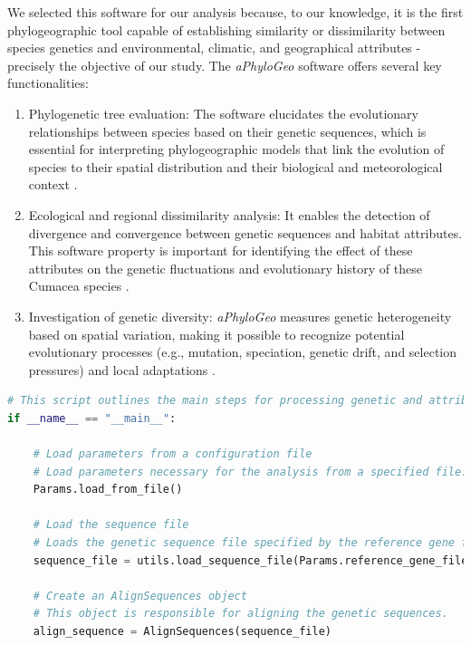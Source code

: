 {We selected this software for our analysis because, to our knowledge, it is the first phylogeographic tool capable of establishing similarity or dissimilarity between species genetics and environmental, climatic, and geographical attributes \citep{koshkarov_phylogeography_2022} - precisely the objective of our study. The \textit{aPhyloGeo} software offers several key functionalities:

\begin{enumerate}[label=\arabic*.]
\item Phylogenetic tree evaluation: The software elucidates the evolutionary relationships between species based on their genetic sequences, which is essential for interpreting phylogeographic models that link the evolution of species to their spatial distribution and their biological and meteorological context \citep{koshkarov_phylogeography_2022}.
\item Ecological and regional dissimilarity analysis: It enables the detection of divergence and convergence between genetic sequences and habitat attributes. This software property is important for identifying the effect of these attributes on the genetic fluctuations and evolutionary history of these Cumacea species \citep{koshkarov_phylogeography_2022}.
\item Investigation of genetic diversity: \textit{aPhyloGeo} measures genetic heterogeneity based on spatial variation, making it possible to recognize potential evolutionary processes (e.g., mutation, speciation, genetic drift, and selection pressures) and local adaptations \citep{manel_perspectives_2010}.
\end{enumerate}

\begin{lstlisting}[label=lst:main,language=Python,caption=Main script for tutorial using the aPhyloGeo package.]
# This script outlines the main steps for processing genetic and attribute data using the aPhyloGeo package.
if __name__ == "__main__":

    # Load parameters from a configuration file
    # Load parameters necessary for the analysis from a specified file.
    Params.load_from_file()

    # Load the sequence file
    # Loads the genetic sequence file specified by the reference gene filepath.
    sequence_file = utils.load_sequence_file(Params.reference_gene_filepath)

    # Create an AlignSequences object
    # This object is responsible for aligning the genetic sequences.
    align_sequence = AlignSequences(sequence_file)


\end{lstlisting}}
